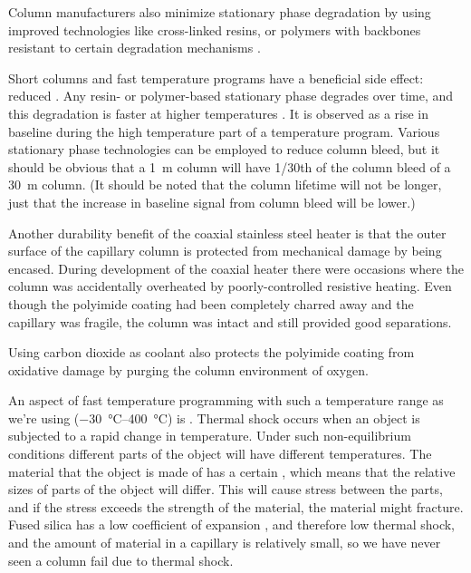 Column manufacturers also minimize sta\-tion\-ary phase degradation by using
improved technologies like cross-linked resins, or polymers with backbones
resistant to certain degradation mechanisms \autocite{Day2003}.


Short columns and fast temperature programs have a beneficial side effect:
reduced . Any resin- or polymer-based stationary phase
degrades over time, and this degradation is faster at higher temperatures
\autocite[p. 66]{Mcnair2019}. It is observed as a rise in baseline during the
high temperature part of a temperature program. Various stationary phase
technologies can be employed to reduce column bleed, but it should be obvious
that a \SI{1}{\metre} column will have \num{1/30}th  of the
column bleed of a \SI{30}{\metre} column. (It should be noted that the column
lifetime will not be longer, just that the increase in baseline signal from
column bleed will be lower.)

Another durability benefit of the coaxial stainless steel heater is that the
outer surface of the capillary column is protected from mechanical damage by
being encased. During development of the coaxial heater there were occasions
where the column was accidentally overheated by poorly-controlled resistive
heating. Even though the polyimide coating had been completely charred away and
the capillary was fragile, the column was intact and still provided good
separations.

Using carbon dioxide as coolant also protects the polyimide coating from
oxidative damage by purging the column environment of oxygen.

An aspect of fast temperature programming with such a temperature range as we're
using (\SIrange{-30}{400}{\celsius}) is . Thermal shock
occurs when an object is subjected to a rapid change in temperature. Under such
non-equilibrium conditions different parts of the object will have different
temperatures. The material that the object is made of has a certain
, which means that the relative sizes
of parts of the object will differ. This will cause stress between the parts,
and if the stress exceeds the strength of the material, the material might
fracture. Fused silica has a low coefficient of expansion , and
therefore low thermal shock, and the amount of material in a capillary is
relatively small, so we have never seen a column fail due to thermal shock.

